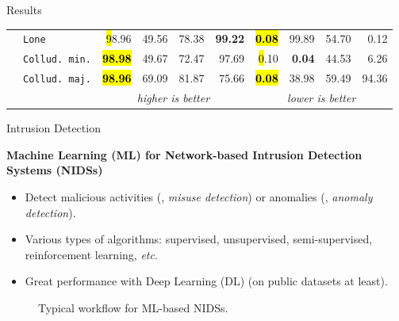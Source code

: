 \begin{frame}{Results}
\begin{table}
\begin{tabularx}{.8\textwidth}{lX|rrrr|rrrr}
      & \texttt{Lone}          & \hl 98.96 & 49.56 & 78.38 & \textbf{99.22} &\hl \textbf{0.08} & 99.89 & 54.70 & 0.12 \\
      & \texttt{Collud. min.}  & \hl \textbf{98.98} & 49.67 & 72.47 & 97.69 & \hl 0.10 & \textbf{0.04} & 44.53 & 6.26 \\
      & \texttt{Collud. maj.}  & \hl \textbf{98.96} & 69.09 & 81.87 & 75.66 & \hl \textbf{0.08} & 38.98 & 59.49 & 94.36 \\          
      \bottomrule %
      \small & \multicolumn{1}{c}{} & \multicolumn{4}{c}{\emph{higher is better}} & \multicolumn{4}{c}{\emph{lower is better}}
    \end{tabularx}
  \end{table}
  
\end{frame}
\begin{frame}{Intrusion Detection}
  
  \textbf{Machine Learning (ML) for Network-based Intrusion Detection Systems (NIDSs)}
  \begin{itemize}
    \item Detect \alert{malicious} activities (\ie, \textit{misuse detection}) or \alert{anomalies} (\ie, \textit{anomaly detection}).
    \item Various types of algorithms: \alert<2>{supervised}, unsupervised, semi-supervised, reinforcement learning, \textit{etc}.
    \item Great performance with Deep Learning (DL) (on public datasets at least).
  \end{itemize}
  \bigskip
    
  \begin{figure}
    \centering
    \caption{Typical workflow for ML-based NIDSs.}
  \end{figure}
\end{frame}

